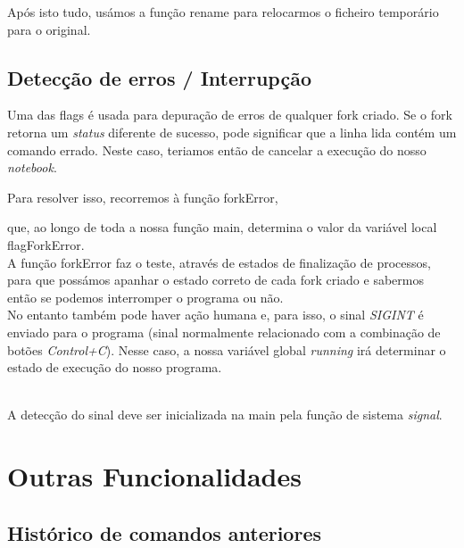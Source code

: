 \documentclass[11pt,a4paper]{report}
\begin{document}
Após isto tudo, usámos a função rename para relocarmos o ficheiro temporário para o original.



\pagebreak
\section{Detecção de erros / Interrupção}



Uma das flags é usada para depuração de erros de qualquer fork criado. Se o fork retorna um \textit{status} diferente de sucesso, pode significar que a linha lida contém um comando errado.
Neste caso, teriamos então de cancelar a execução do nosso \textit{notebook}.

Para resolver isso, recorremos à função forkError,



que, ao longo de toda a nossa função main, determina o valor da variável local flagForkError. 
~\\

A função forkError faz o teste, através de estados de finalização de processos, para que possámos apanhar o estado correto de cada fork criado e sabermos então se podemos interromper o programa ou não.
~\\

No entanto também pode haver ação humana e, para isso, o sinal \textit{SIGINT} é enviado para o programa (sinal normalmente relacionado com a combinação de botões \textit{Control+C}).
Nesse caso, a nossa variável global \textit{running} irá determinar o estado de execução do nosso programa.


~\\

A detecção do sinal deve ser inicializada na main pela função de sistema \textit{signal}.
\raggedbottom
\pagebreak

\chapter{Outras Funcionalidades}
\section{Histórico de comandos anteriores}
\end{document}
